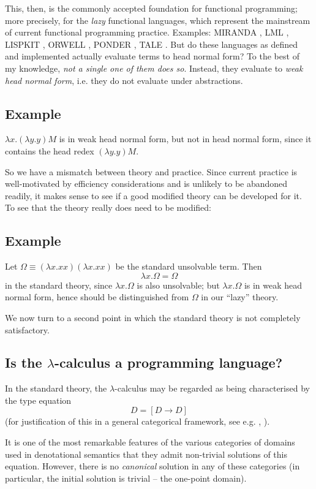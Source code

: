 This, then, is the commonly accepted foundation for functional programming; 
more precisely, for the {\em lazy} functional languages, 
which represent the mainstream of current functional programming practice. 
Examples: MIRANDA \cite{Tur85}, LML \cite{Aug84}, LISPKIT \cite{Hen80}, 
ORWELL \cite {Wad85}, PONDER \cite{Fai85}, 
TALE \cite{BvL86}. 
But do these languages as defined and implemented actually evaluate terms 
to head normal form? 
To the best of my knowledge, {\em not a single one of them does so}. 
Instead, they evaluate to {\em weak head normal form}, i.e. they do not 
evaluate under abstractions. 
\subsection*{Example} 
$\lambda x. (\lambda y . y)M$ is in weak head normal form, but not in head normal form, since it contains the head redex $(\lambda y . y) M$.

So we have a mismatch between theory and practice. 
Since current practice is well-motivated by efficiency considerations and 
is unlikely to be abandoned readily, it makes sense to see if a good 
modified theory can be developed for it. 
To see that the theory really does need to be modified:
\subsection*{Example}
Let $\Omega \equiv (\lambda x . xx)(\lambda x . xx)$ be the standard 
unsolvable term. Then
\[ \lambda x . \Omega = \Omega \]
in the standard theory, since $\lambda x . \Omega$ is also unsolvable; 
but $\lambda x. \Omega$ is in weak head normal form, hence should be 
distinguished from $\Omega$ in our ``lazy'' theory.

We now turn to a second point in which the standard theory is not completely 
satisfactory.
\subsection*{Is the $\lambda$-calculus a programming language?}
In the standard theory, the $\lambda$-calculus may be regarded as being 
characterised by the type equation
\[ D = [D \rightarrow D] \]
(for justification of this in a general categorical framework, see e.g. 
\cite{Sco80a}, \cite{Koy82,LS86}).

It is one of the most remarkable features of the various categories of 
domains used in denotational semantics that they admit non-trivial 
solutions of this equation. 
However, there is no {\em canonical} solution in any of these categories 
(in particular, the initial solution is trivial -- the one-point domain).

